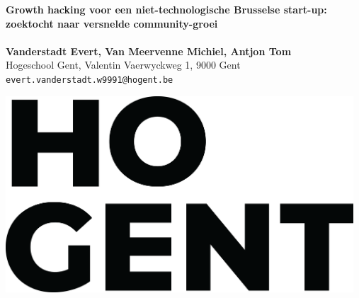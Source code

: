\documentclass[a0,portrait]{a0poster}
\begin{document}


\begin{minipage}[t]{0.75\linewidth}
\veryHuge \color{HoGentAccent1} \textbf{Growth hacking voor een niet-technologische Brusselse start-up: zoektocht naar versnelde community-groei} \color{Black}\\ %
\Huge\textit{}\\[2.4cm] %
\huge \textbf{Vanderstadt Evert, Van Meervenne Michiel, Antjon Tom}\\[0.5cm] %
\huge Hogeschool Gent, Valentin Vaerwyckweg 1, 9000 Gent\\[0.4cm] %
\Large \texttt{evert.vanderstadt.w9991@hogent.be} \\
\end{minipage}
%
\begin{minipage}[t]{0.25\linewidth}
\includegraphics[width=13cm,right]{figures/HG-beeldmerk-woordmerk.png} 

\end{minipage}

\vspace{1cm} %

\end{document}
